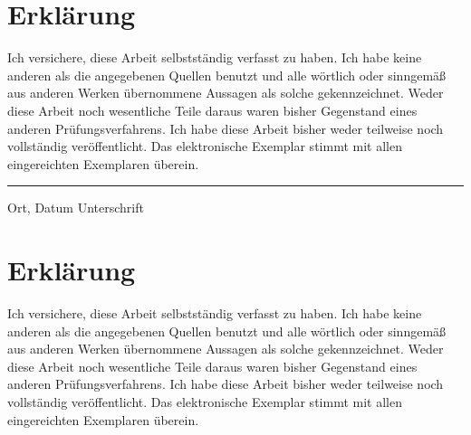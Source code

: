 \documentclass[conference,compsoc,ngerman]{IEEEtran}
\begin{document}

%
%
%





\clearpage
{}
\onecolumn

\section*{Erklärung}

Ich versichere, diese Arbeit selbstständig verfasst zu haben.
Ich habe keine anderen als die angegebenen Quellen benutzt und alle wörtlich oder sinngemäß aus anderen Werken übernommene Aussagen als solche gekennzeichnet.
Weder diese Arbeit noch wesentliche Teile daraus waren bisher Gegenstand eines anderen Prüfungsverfahrens.
Ich habe diese Arbeit bisher weder teilweise noch vollständig veröffentlicht.
Das elektronische Exemplar stimmt mit allen eingereichten Exemplaren überein.

\vspace{4cm}

\hrule
\vspace{0.2cm}
Ort, Datum \hfill Unterschrift \hspace{2cm}

\clearpage

\onecolumn
\section*{Erklärung}

Ich versichere, diese Arbeit selbstständig verfasst zu haben.
Ich habe keine anderen als die angegebenen Quellen benutzt und alle wörtlich oder sinngemäß aus anderen Werken übernommene Aussagen als solche gekennzeichnet.
Weder diese Arbeit noch wesentliche Teile daraus waren bisher Gegenstand eines anderen Prüfungsverfahrens.
Ich habe diese Arbeit bisher weder teilweise noch vollständig veröffentlicht.
Das elektronische Exemplar stimmt mit allen eingereichten Exemplaren überein.
\end{document}

